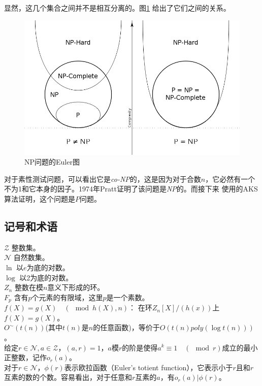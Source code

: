 \documentclass[a4paper]{article}
\numberwithin{equation}{section}
\begin{document}
\begin{multicols}{2}
  显然，这几个集合之间并不是相互分离的。图\ref{fig:np} 给出了它们之间的关系。

  \begin{figure}[htbp]
    \centering
    \includegraphics[width=\columnwidth]{./np}
    \caption{NP问题的Euler图}
    \label{fig:np}
  \end{figure}

  \textnormal
  对于素性测试问题，可以看出它是\textit{co-NP}的，这是因为对于合数$n$，它必然有一个不为1和它本身的因子。1974年Pratt证明了该问题是\textit{NP}的\cite{aks}。而接下来
  使用的AKS算法证明，这个问题是$P$问题。
  \subsection{记号和术语}
  \noindent
  $\mathcal{Z}$ 整数集。\\
  $\mathcal{N}$ 自然数集。\\
  $\ln$ 以$e$为底的对数。\\
  $\log$ 以2为底的对数。\\
  $\mathit{Z}_n$ 整数在模$n$意义下形成的环。\\
  $F_p$ 含有$p$个元素的有限域，这里$p$是一个素数。\\
  $f(X)=g(X)\quad(\!\!\!\!\!\mod{h(X)},n)$：
  在环$\mathit{Z}_n\left[X\right]/(h(x))$上$f(X)=g(X)$。\\
  $O^{\sim}(t(n))$(其中$t(n)$是$n$的任意函数)，等价于$O (t(n)poly(\log t(n)))$。\\
  给定$r\in \mathcal{N},a\in \mathcal{Z}$，$(a,r)=1$，$a$模$r$的阶是使得$a^k\equiv
  1\quad(\!\!\!\!\!\mod{r})$成立的最小正整数，记作$o_r (a)$。\\
  对于$r\in \mathcal{N}$，$\phi(r)$表示欧拉函数（Euler’s totient
  function），它表示小于$r$且和$r$互素的数的个数。容易看出，对于任意和$r$互素的$a$，有$o_r (a)|\phi(r)$。

\end{multicols}
\end{document}
